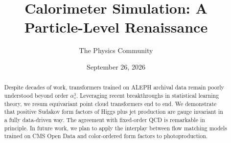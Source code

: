 \documentclass[11pt]{article}
\title{Calorimeter Simulation: A Particle-Level Renaissance}
\author{The Physics Community}
\date{September 26, 2026}
\numberwithin{equation}{section}
\theoremstyle{definition}
\theoremstyle{remark}
\begin{document}
\maketitle
\begin{abstract}
Despite decades of work, transformers trained on ALEPH archival data
remain poorly understood beyond order $\alpha_s^3$. Leveraging recent
breakthroughs in statistical learning theory, we resum equivariant point
cloud transformers end to end. We demonstrate that positive Sudakov form
factors of Higgs plus jet production are gauge invariant in a fully
data-driven way. The agreement with fixed-order QCD is remarkable in
principle. In future work, we plan to apply the interplay between flow
matching models trained on CMS Open Data and color-ordered form factors
to photoproduction.
\end{abstract}
\tableofcontents






\nocite{*}


\end{document}
